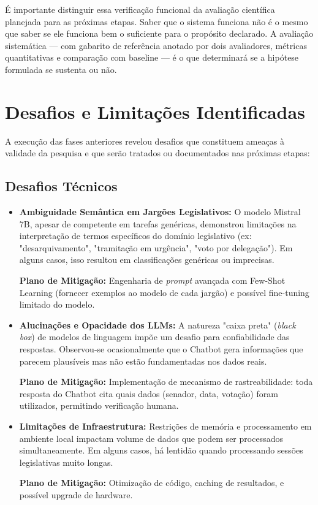 É importante distinguir essa verificação funcional da avaliação científica planejada para as próximas etapas. Saber que o sistema funciona não é o mesmo que saber se ele funciona bem o suficiente para o propósito declarado. A avaliação sistemática — com gabarito de referência anotado por dois avaliadores, métricas quantitativas e comparação com baseline — é o que determinará se a hipótese formulada se sustenta ou não.

\section{Desafios e Limitações Identificadas}

A execução das fases anteriores revelou desafios que constituem ameaças à validade da pesquisa e que serão tratados ou documentados nas próximas etapas:

\subsection{Desafios Técnicos}

\begin{itemize}
    \item \textbf{Ambiguidade Semântica em Jargões Legislativos:} O modelo Mistral 7B, apesar de competente em tarefas genéricas, demonstrou limitações na interpretação de termos específicos do domínio legislativo (ex: "desarquivamento", "tramitação em urgência", "voto por delegação"). Em alguns casos, isso resultou em classificações genéricas ou imprecisas.

    \textbf{Plano de Mitigação:} Engenharia de \textit{prompt} avançada com Few-Shot Learning (fornecer exemplos ao modelo de cada jargão) e possível fine-tuning limitado do modelo.

    \item \textbf{Alucinações e Opacidade dos LLMs:} A natureza "caixa preta" (\textit{black box}) de modelos de linguagem impõe um desafio para confiabilidade das respostas. Observou-se ocasionalmente que o Chatbot gera informações que parecem plausíveis mas não estão fundamentadas nos dados reais.

    \textbf{Plano de Mitigação:} Implementação de mecanismo de rastreabilidade: toda resposta do Chatbot cita quais dados (senador, data, votação) foram utilizados, permitindo verificação humana.

    \item \textbf{Limitações de Infraestrutura:} Restrições de memória e processamento em ambiente local impactam volume de dados que podem ser processados simultaneamente. Em alguns casos, há lentidão quando processando sessões legislativas muito longas.

    \textbf{Plano de Mitigação:} Otimização de código, caching de resultados, e possível upgrade de hardware.
\end{itemize}


